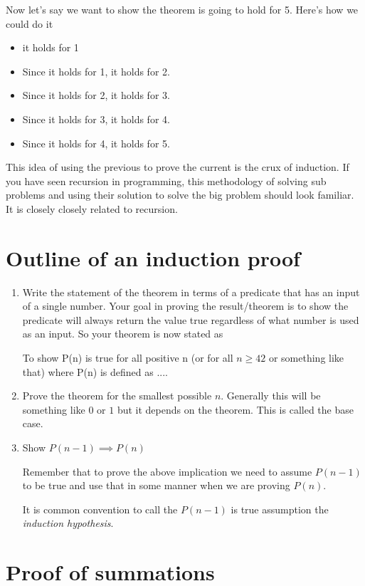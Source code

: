 \documentclass[12pt]{article}
\begin{document}
Now let's say we want to show the theorem is going to hold for 5. Here's how we could do it

\begin{itemize}
\item it holds for 1
\item Since it holds for 1, it holds for 2.
\item Since it holds for 2, it holds for 3.
\item Since it holds for 3, it holds for 4.
\item Since it holds for 4, it holds for 5.
\end{itemize}

This idea of using the previous to prove the current is the crux of induction. If you have seen recursion in programming, this methodology of solving sub problems and using their solution to solve the big problem should look familiar. It is closely closely related to recursion. 

\section*{Outline of an induction proof}

\begin{enumerate}
\item Write the statement of the theorem in terms of a predicate that has an input of a single number.  Your goal in proving the result/theorem is to show the predicate will always return the value true regardless of what number is used as an input. So your theorem is now stated as 

To show P(n) is true for all positive n (or for all $n \ge 42$ or something like that) where P(n) is defined as ....

\item Prove the theorem for the smallest possible $n$. Generally this will be something like $0$ or $1$ but it depends on the theorem. This is called the base case.
\item Show $P(n-1) \implies P(n)$

Remember that to prove the above implication we need to assume $P(n-1)$ to be true and use that in some manner when we are proving $P(n)$.

It is common convention to call the $P(n-1)$ is true assumption the \emph{induction hypothesis}.

\end{enumerate}

\section*{Proof of summations}
\end{document}
